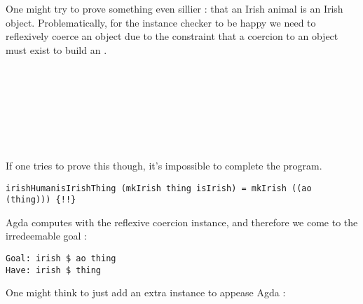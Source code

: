 One might try to prove something even sillier : that an Irish animal is an Irish
object. Problematically, for the instance checker to be happy we need to
reflexively coerce an object due to the constraint that a coercion to an object
must exist to build an . 

\begin{code}%
\>[0]\<%
\\
\>[0][@{}l@{\AgdaIndent{0}}]%
\>[2]\AgdaSpace{}%
\AgdaSymbol{:}\AgdaSpace{}%
\AgdaSpace{}%
\AgdaSpace{}%
\<%
\\
\>[0]\<%
\\
\>[0][@{}l@{\AgdaIndent{0}}]%
\>[2]\AgdaSpace{}%
\AgdaSymbol{=}\AgdaSpace{}%
\AgdaSpace{}%
\AgdaSpace{}%
\<%
\\
%
\\[\AgdaEmptyExtraSkip]%
\>[0]\<%
\\
\>[0][@{}l@{\AgdaIndent{0}}]%
\>[2]\AgdaSpace{}%
\AgdaSymbol{:}\AgdaSpace{}%
\AgdaSpace{}%
\AgdaSpace{}%
\AgdaSpace{}%
\AgdaSpace{}%
\<%
\end{code}

If one tries to prove this though, it's impossible to complete the program.

\begin{verbatim}
irishHumanisIrishThing (mkIrish thing isIrish) = mkIrish ((ao (thing))) {!!}
\end{verbatim}

Agda computes with the reflexive coercion instance, and therefore we come to the
irredeemable goal :

\begin{verbatim}
Goal: irish $ ao thing
Have: irish $ thing
\end{verbatim}

One might think to just add an extra instance to appease Agda :

\begin{code}%
\>[0]\<%
\\
\>[0][@{}l@{\AgdaIndent{0}}]%
\>[2]\AgdaSpace{}%
\AgdaSymbol{=}\AgdaSpace{}%
\AgdaSpace{}%
\AgdaSpace{}%
\AgdaSpace{}%
\AgdaSpace{}%
\<%
\end{code}

